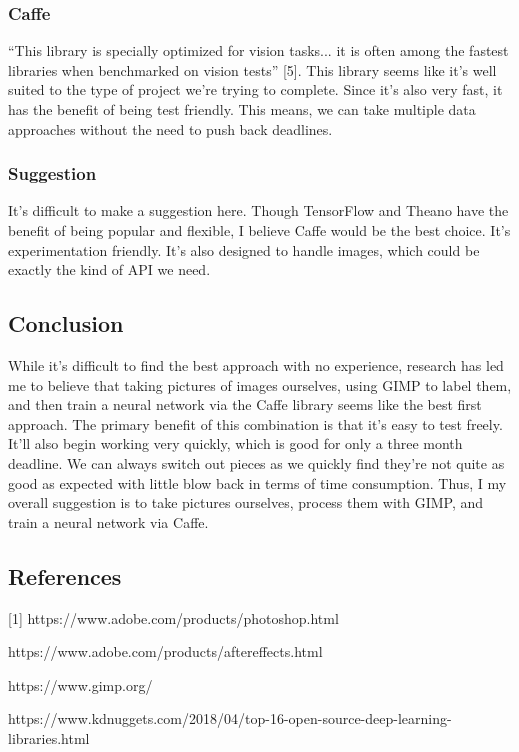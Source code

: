 \documentclass[10pt,journal,compsoc, draftclsnofoot,onecolumn]{IEEEtran}
\begin{document}
\subsubsection{Caffe}
“This library is specially optimized for vision tasks... it is often among the fastest libraries when benchmarked on vision tests” [5].
This library seems like it's well suited to the type of project we're trying to complete.
Since it's also very fast, it has the benefit of being test friendly.
This means, we can take multiple data approaches without the need to push back deadlines.

\subsubsection{Suggestion}
It's difficult to make a suggestion here.
Though TensorFlow and Theano have the benefit of being popular and flexible, I believe Caffe would be the best choice.
It's experimentation friendly. It's also designed to handle images, which could be exactly the kind of API we need.


\subsection{Conclusion}
While it's difficult to find the best approach with no experience, research has led me to believe that taking pictures of images ourselves, using GIMP to label them, and then train a neural network via the Caffe library seems like the best first approach.
The primary benefit of this combination is that it's easy to test freely.
It'll also begin working very quickly, which is good for only a three month deadline.
We can always switch out pieces as we quickly find they're not quite as good as expected with little blow back in terms of time consumption.
Thus, I my overall suggestion is to take pictures ourselves, process them with GIMP, and train a neural network via Caffe.

\subsection{References}
[1]	https://www.adobe.com/products/photoshop.html

\noindent
[2]	https://www.adobe.com/products/aftereffects.html

\noindent
[3]	https://www.gimp.org/

\noindent
[4]	https://www.kdnuggets.com/2018/04/top-16-open-source-deep-learning-libraries.html
\end{document}
